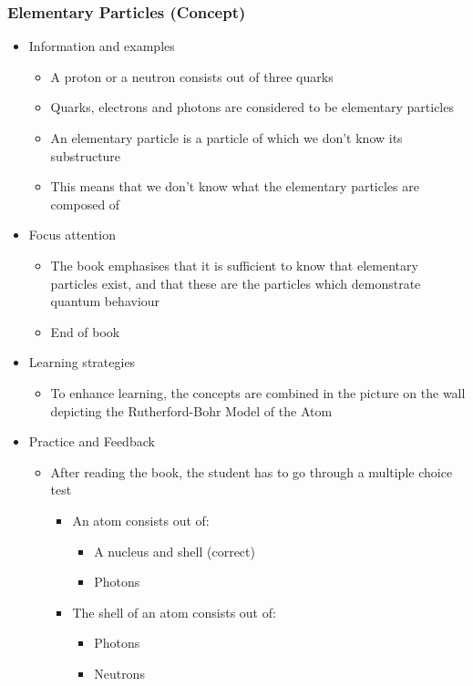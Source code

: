 \documentclass[11pt,twoside]{report} %
\begin{document}
\subsubsection{Elementary Particles (Concept)}
\begin{itemize}
	\item Information and examples
	\begin{itemize}
		\item A proton or a neutron consists out of three quarks
		\item Quarks, electrons and photons are considered to be elementary particles
		\item An elementary particle is a particle of which we don’t know its substructure
		\item This means that we don’t know what the elementary particles are composed of
	\end{itemize}
	\item Focus attention
	\begin{itemize}
		\item The book emphasises that it is sufficient to know that elementary particles exist, and that these are the particles which demonstrate quantum behaviour
		\item {End of book}
	\end{itemize}
	\item Learning strategies
	\begin{itemize}
		\item To enhance learning, the concepts are combined in the picture on the wall depicting the Rutherford-Bohr Model of the Atom
	\end{itemize}
	\item Practice and Feedback
	\begin{itemize}
		\item After reading the book, the student has to go through a multiple choice test
		\begin{itemize}
			\item An atom consists out of:
			\begin{itemize}
				\item A nucleus and shell (correct)
				\item Photons
			\end{itemize}
			\item The shell of an atom consists out of:
			\begin{itemize}
				\item Photons
				\item Neutrons

\end{itemize}
\end{itemize}
\end{itemize}
\end{itemize}
\end{document}

